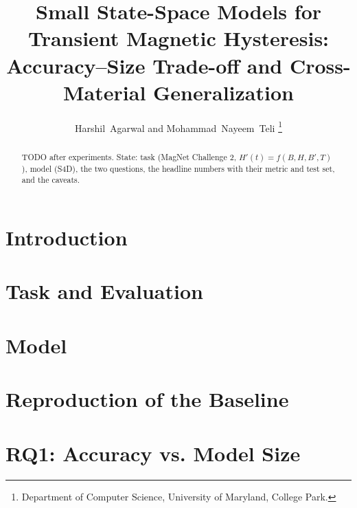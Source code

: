 \documentclass[journal]{IEEEtran}
\title{Small State-Space Models for Transient Magnetic Hysteresis:\\
Accuracy--Size Trade-off and Cross-Material Generalization}
\author{Harshil~Agarwal and Mohammad~Nayeem~Teli%
\thanks{Department of Computer Science, University of Maryland, College Park.}}
\begin{document}
\maketitle

\begin{abstract}
TODO after experiments. State: task (MagNet Challenge 2, $H'(t)=f(B,H,B',T)$), model (S4D),
the two questions, the headline numbers with their metric and test set, and the caveats.
\end{abstract}

\section{Introduction}

\section{Task and Evaluation}

\section{Model}

\section{Reproduction of the Baseline}

\section{RQ1: Accuracy vs. Model Size}
\end{document}

